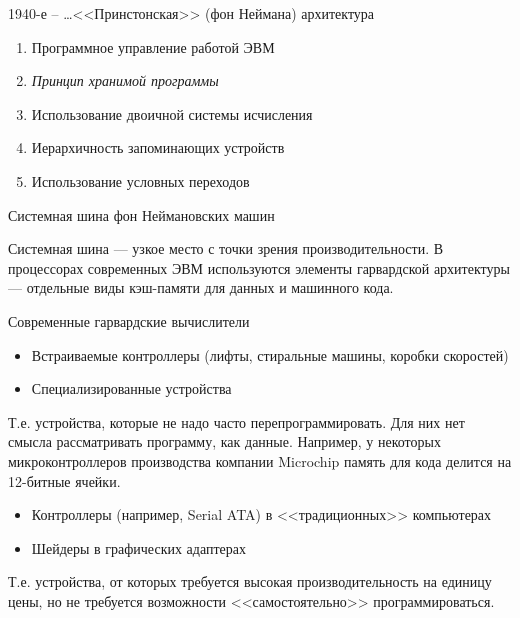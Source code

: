 \documentclass[xetex,aspectratio=43]{beamer}
\begin{document}
\begin{frame}{1940-е -- \ldots <<Принстонская>> (фон Неймана) архитектура}
	\begin{figure}
		
	\end{figure}
	
	\pause
	
	\begin{enumerate}
		\item
		Программное управление работой ЭВМ
		\item
		\em{Принцип хранимой программы}
		\item
		Использование двоичной системы исчисления
		\item
		Иерархичность запоминающих устройств
		\item
		Использование условных переходов
	\end{enumerate}
\end{frame}

\begin{frame}{Системная шина фон Неймановских машин}
		\begin{figure}
						
		\end{figure}
		
		\pause
		
		Системная шина --- узкое место с точки зрения производительности. В
		процессорах современных ЭВМ используются элементы гарвардской
		архитектуры --- отдельные виды кэш-памяти для данных и машинного кода.
\end{frame}

\begin{frame}{Современные гарвардские вычислители}
	\begin{itemize}
		\item
		Встраиваемые контроллеры (лифты, стиральные машины, коробки скоростей)
		\item
		Специализированные устройства
	\end{itemize}
		
		Т.е. устройства, которые не надо часто перепрограммировать. Для них нет
		смысла рассматривать программу, как данные. Например, у некоторых
		микроконтроллеров производства компании Microchip память для кода
		делится на 12-битные ячейки.

	\pause
	
	\begin{itemize}
		\item Контроллеры (например, Serial ATA) в <<традиционных>> компьютерах
		\item Шейдеры в графических адаптерах
	\end{itemize}

	Т.е. устройства, от которых требуется высокая производительность на единицу цены,
	но не требуется возможности <<самостоятельно>> программироваться.
		
\end{frame}
\end{document}
